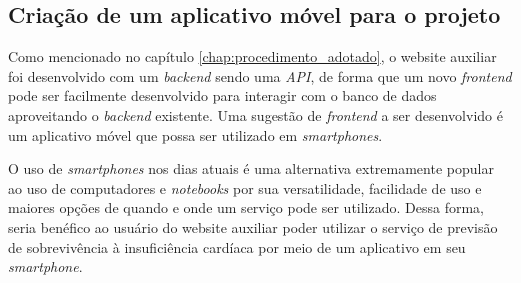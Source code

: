 \subsection{Criação de um aplicativo móvel para o projeto}

Como mencionado no capítulo \ref{chap:procedimento_adotado}, o website auxiliar foi desenvolvido com um \textit{backend} sendo uma \textit{API}, de forma que um novo \textit{frontend} pode ser facilmente desenvolvido para interagir com o banco de dados aproveitando o \textit{backend} existente. Uma sugestão de \textit{frontend} a ser desenvolvido é um aplicativo móvel que possa ser utilizado em \textit{smartphones}.

O uso de \textit{smartphones} nos dias atuais é uma alternativa extremamente popular ao uso de computadores e \textit{notebooks} por sua versatilidade, facilidade de uso e maiores opções de quando e onde um serviço pode ser utilizado. Dessa forma, seria benéfico ao usuário do website auxiliar poder utilizar o serviço de previsão de sobrevivência à insuficiência cardíaca por meio de um aplicativo em seu \textit{smartphone}.
